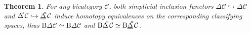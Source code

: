 \documentclass[]{amsart}
\newtheorem{theorem}{Theorem}[section]
\begin{document}
\begin{theorem}For any bicategory ${\ensuremath{\mathcal{C}}}$, both simplicial inclusion functors ${{\ensuremath{\Delta}}{\ensuremath{\mathcal{C}}}\hookrightarrow {\ensuremath{\underline{\Delta}}}{\ensuremath{\mathcal{C}}}}$  and ${\ensuremath{\Delta}}\hspace{-3pt}^{^\mathrm{u}}{\ensuremath{\mathcal{C}}}\hookrightarrow{\ensuremath{\underline{\Delta}}}\hspace{-3pt}^{^\mathrm{u}}{\ensuremath{\mathcal{C}}}$ induce
homotopy equivalences on the corresponding classifying spaces, thus $ {\ensuremath{\mathrm{B}}}{\ensuremath{\Delta}}{\ensuremath{\mathcal{C}}} \simeq
{\ensuremath{\mathrm{B}}}{\ensuremath{\underline{\Delta}}}{\ensuremath{\mathcal{C}}}$ and ${\ensuremath{\mathrm{B}}}{\ensuremath{\Delta}}\hspace{-3pt}^{^\mathrm{u}}{\ensuremath{\mathcal{C}}}\simeq
{\ensuremath{\mathrm{B}}}{\ensuremath{\underline{\Delta}}}\hspace{-3pt}^{^\mathrm{u}}{\ensuremath{\mathcal{C}}}$.
\end{theorem}
\end{document}
